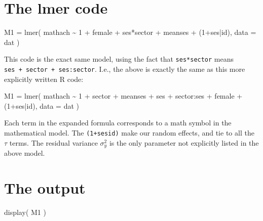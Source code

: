 \documentclass[
  letterpaper,
  DIV=11,
  numbers=noendperiod]{scrreprt}
\newenvironment{Shaded}{\begin{snugshade}}{\end{snugshade}}
\newcommand{\AttributeTok}[1]{\textcolor[rgb]{0.49,0.56,0.16}{#1}}
\newcommand{\DecValTok}[1]{\textcolor[rgb]{0.25,0.63,0.44}{#1}}
\newcommand{\FunctionTok}[1]{\textcolor[rgb]{0.02,0.16,0.49}{#1}}
\newcommand{\NormalTok}[1]{\textcolor[rgb]{0.00,0.44,0.13}{#1}}
\newcommand{\OtherTok}[1]{\textcolor[rgb]{0.00,0.44,0.13}{#1}}
\newcommand{\SpecialCharTok}[1]{\textcolor[rgb]{0.25,0.44,0.63}{#1}}
\begin{document}
\hypertarget{the-lmer-code}{%
\section{The lmer code}\label{the-lmer-code}}

\begin{Shaded}
\begin{Highlighting}[]
\NormalTok{M1 }\OtherTok{=} \FunctionTok{lmer}\NormalTok{( mathach }\SpecialCharTok{\textasciitilde{}} \DecValTok{1} \SpecialCharTok{+}\NormalTok{ female }\SpecialCharTok{+}\NormalTok{ ses}\SpecialCharTok{*}\NormalTok{sector }\SpecialCharTok{+} 
\NormalTok{             meanses }\SpecialCharTok{+}\NormalTok{ (}\DecValTok{1}\SpecialCharTok{+}\NormalTok{ses}\SpecialCharTok{|}\NormalTok{id),}
           \AttributeTok{data =}\NormalTok{ dat )}
\end{Highlighting}
\end{Shaded}

This code is the exact same model, using the fact that
\texttt{ses*sector} means \texttt{ses\ +\ sector\ +\ ses:sector}. I.e.,
the above is exactly the same as this more explicitly written R code:

\begin{Shaded}
\begin{Highlighting}[]
\NormalTok{M1 }\OtherTok{=} \FunctionTok{lmer}\NormalTok{( mathach }\SpecialCharTok{\textasciitilde{}} \DecValTok{1} \SpecialCharTok{+}\NormalTok{ sector }\SpecialCharTok{+}\NormalTok{ meanses }\SpecialCharTok{+}\NormalTok{ ses }\SpecialCharTok{+}\NormalTok{ sector}\SpecialCharTok{:}\NormalTok{ses }\SpecialCharTok{+}\NormalTok{ female }\SpecialCharTok{+}\NormalTok{ (}\DecValTok{1}\SpecialCharTok{+}\NormalTok{ses}\SpecialCharTok{|}\NormalTok{id),}
           \AttributeTok{data =}\NormalTok{ dat )}
\end{Highlighting}
\end{Shaded}

Each term in the expanded formula corresponds to a math symbol in the
mathematical model. The \texttt{(1+ses\textbar{}id)} make our random
effects, and tie to all the \(\tau\) terms. The residual variance
\(\sigma^2_y\) is the only parameter not explicitly listed in the above
model.

\hypertarget{the-output}{%
\section{The output}\label{the-output}}

\begin{Shaded}
\begin{Highlighting}[]
\FunctionTok{display}\NormalTok{( M1 )}
\end{Highlighting}
\end{Shaded}
\end{document}

